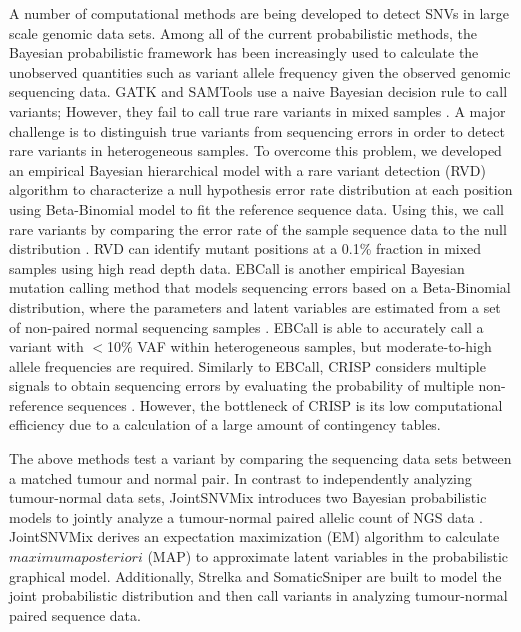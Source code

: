 \documentclass[11pt,reqno]{amsart}
\begin{document}
A number of computational methods are being developed to detect SNVs in large scale genomic data sets.
Among all of the current probabilistic methods, the Bayesian probabilistic framework has been increasingly used to calculate the unobserved quantities such as variant allele frequency given the observed genomic sequencing data.
GATK \citep{mckenna2010genome} and SAMTools \citep{li2009sequence} use a naive Bayesian decision rule to call variants;
However, they fail to call true rare variants in mixed samples \citep{he2015rvd2}.
A major challenge is to distinguish true variants from sequencing errors in order to detect rare variants in heterogeneous samples.
To overcome this problem, we developed an empirical Bayesian hierarchical model with a rare variant detection (RVD) algorithm to characterize a null hypothesis error rate distribution at each position using Beta-Binomial model to fit the reference sequence data. Using this, we call rare variants by comparing the error rate of the sample sequence data to the null distribution \citep{flaherty2011ultrasensitive}.
RVD can identify mutant positions at a 0.1\% fraction in mixed samples using high read depth data.
EBCall is another empirical Bayesian mutation calling method that models sequencing errors based on a Beta-Binomial distribution, where the parameters and latent variables are estimated from a set of non-paired normal sequencing samples \citep{shiraishi2013empirical}.
EBCall is able to accurately call a variant with $<$10\% VAF within heterogeneous samples, but moderate-to-high allele frequencies are required.
Similarly to EBCall, CRISP considers multiple signals to obtain sequencing errors by evaluating the probability of multiple non-reference sequences \citep{bansal2010statistical}.
However, the bottleneck of CRISP is its low computational efficiency due to a calculation of a large amount of contingency tables.

The above methods test a variant by comparing the sequencing data sets between a matched tumour and normal pair.
In contrast to independently analyzing tumour-normal data sets, JointSNVMix introduces two Bayesian probabilistic models to jointly analyze a tumour-normal paired allelic count of NGS data \citep{roth2012jointsnvmix}.
JointSNVMix derives an expectation maximization (EM) algorithm to calculate $\mathit{maximum} \mathit{a} \mathit{posteriori}$ (MAP) to approximate latent variables in the probabilistic graphical model.
Additionally, Strelka \citep{saunders2012strelka} and SomaticSniper \citep{larson2012somaticsniper} are built to model the joint probabilistic distribution and then call variants in analyzing tumour-normal paired sequence data.
\end{document}
